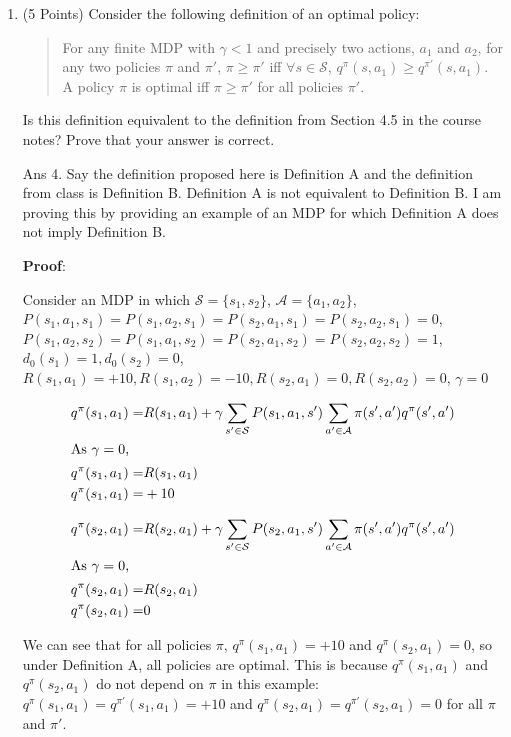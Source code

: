 \documentclass[]{article}
\begin{document}
\begin{enumerate}
{	}
    \item (5 Points) Consider the following definition of an optimal policy:
    \begin{quote}
        For any finite MDP with $\gamma<1$ and precisely two actions, $a_1$ and $a_2$, for any two policies $\pi$ and $\pi'$, $\pi \geq \pi'$ iff $\forall s \in \mathcal S$, $q^\pi(s,a_1) \geq q^{\pi'}(s,a_1)$. A policy $\pi$ is optimal iff $\pi \geq \pi'$ for all policies $\pi'$. 
    \end{quote}
    Is this definition equivalent to the definition from Section 4.5 in the course notes? Prove that your answer is correct.

	{
		\color{blue}
			Ans 4. Say the definition proposed here is Definition A and the definition from class is Definition B. Definition A is not equivalent to Definition B. I am proving this by providing an example  of an MDP for which Definition A does not imply Definition B.

\textbf{Proof}:

		Consider an MDP in which $\mathcal S = \{s_1, s_2\}$, $\mathcal A = \{a_1, a_2\}$, $P(s_1, a_1, s_1) = P(s_1, a_2, s_1) = P(s_2, a_1, s_1) = P(s_2, a_2, s_1) = 0$, $P(s_1, a_2, s_2) = P(s_1, a_1, s_2) = P(s_2, a_1, s_2) = P(s_2, a_2, s_2) = 1$, $d_0(s_1) = 1, d_0(s_2) = 0$, $R(s_1, a_1) = +10, R(s_1, a_2) = -10, R(s_2, a_1) = 0, R(s_2, a_2) = 0$, $\gamma = 0$

		\begin{align}
			q^{\pi}(s_1, a_1) =& R(s_1, a_1) + \gamma \sum_{s' \in \mathcal S} P(s_1, a_1, s') \sum_{a' \in \mathcal A} \pi(s', a') q^{\pi}(s', a') \\
			\intertext{As $\gamma = 0$, }
			q^{\pi}(s_1, a_1) =& R(s_1, a_1) \\
			q^{\pi}(s_1, a_1) =& +10
		\end{align}

		\begin{align}
			q^{\pi}(s_2, a_1) =& R(s_2, a_1) + \gamma \sum_{s' \in \mathcal S} P(s_2, a_1, s') \sum_{a' \in \mathcal A} \pi(s', a') q^{\pi}(s', a') \\
			\intertext{As $\gamma = 0$, }
			q^{\pi}(s_2, a_1) =& R(s_2, a_1) \\
			q^{\pi}(s_2, a_1) =& 0
		\end{align}

We can see that for all policies $\pi$, $q^\pi(s_1, a_1) = +10$ and $q^\pi(s_2, a_1) = 0$, so under Definition A, all policies are optimal. This is because $q^\pi(s_1, a_1)$ and $q^\pi(s_2, a_1)$ do not depend on $\pi$ in this example: $q^\pi(s_1, a_1) = q^{\pi'}(s_1, a_1) = +10$ and $q^\pi(s_2, a_1) = q^{\pi'}(s_2, a_1) = 0$ for all $\pi$ and $\pi'$.

}
\end{enumerate}
\end{document}
